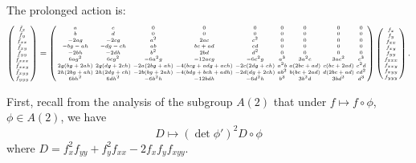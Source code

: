 \documentclass[review,onefignum,onetabnum]{siamonline190516}
\begin{document}
The prolonged action is:
\begin{equation}
\tiny
\arraycolsep=1.4pt
\label{eq:prolong}
\left(
\begin{array}{c}
  \bar f_x \\ \bar f_y \\ \bar f_{xx} \\ \bar f_{xy} \\ \bar f_{yy} \\ \bar f_{xxx} \\ \bar f_{xxy} \\ \bar f_{xyy} \\ \bar f_{yyy} 
 \end{array}
 \right)
 = 
\left(
\begin{array}{ccccccccc}
 a & c & 0 & 0 & 0 & 0 & 0 & 0 & 0 \\
 b & d & 0 & 0 & 0 & 0 & 0 & 0 & 0 \\
 -2 a g & -2 c g & a^2 & 2 a c & c^2 & 0 & 0 & 0 & 0 \\
 -b g-a h & -d g-c h & a b & b c+a d & c d & 0 & 0 & 0 & 0 \\
 -2 b h & -2 d h & b^2 & 2 b d & d^2 & 0 & 0 & 0 & 0 \\
 6 a g^2 & 6 c g^2 & -6 a^2 g & -12 a c g & -6 c^2 g & a^3 & 3 a^2 c & 3 a c^2 & c^3 \\
 2 g (b g+2 a h) & 2 g (d g+2 c h) & -2 a (2 b g+a h) & -4 (b c g+a d g+a c h) & -2 c (2 d
   g+c h) & a^2 b & a (2 b c+a d) & c (b c+2 a d) & c^2 d \\
 2 h (2 b g+a h) & 2 h (2 d g+c h) & -2 b (b g+2 a h) & -4 (b d g+b c h+a d h) & -2 d (d g+2
   c h) & a b^2 & b (b c+2 a d) & d (2 b c+a d) & c d^2 \\
 6 b h^2 & 6 d h^2 & -6 b^2 h & -12 b d h & -6 d^2 h & b^3 & 3 b^2 d & 3 b d^2 & d^3 \\
\end{array}
\right)\left(
\begin{array}{c}
f_x \\ f_y \\ f_{xx} \\ f_{xy} \\ f_{yy} \\ f_{xxx} \\ f_{xxy} \\ f_{xyy} \\ f_{yyy} 
 \end{array}
 \right).
 \end{equation}

First, recall from the analysis of the subgroup $A(2)$ that under $f\mapsto f\circ \phi$, $\phi\in A(2)$, we have 
\begin{equation}
\label{eq:D}
D \mapsto (\det \phi')^2 D\circ \phi
\end{equation}
where $D = f_{x}^2 f_{yy} + f_y^2 f_{xx} - 2 f_x f_y f_{xyy}$. 
\end{document}
